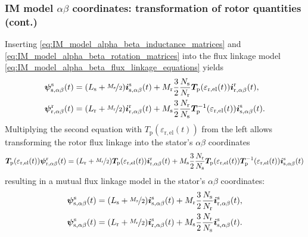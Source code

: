 \begin{frame}
	\frametitle{IM model $\alpha\beta$ coordinates: transformation of rotor quantities (cont.)}
    Inserting \eqref{eq:IM_model_alpha_beta_inductance_matrices} and \eqref{eq:IM_model_alpha_beta_rotation_matrices} into the flux linkage model \eqref{eq:IM_model_alpha_beta_flux_linkage_equations} yields
    \begin{equation}
        \begin{split}
            \bm{\psi}^\mathrm{s}_\mathrm{s,\alpha\beta}(t) & = (L_\mathrm{s} +\nicefrac{M_\mathrm{s}}{2}) \bm{i}^\mathrm{s}_{\mathrm{s},\alpha\beta}(t) +  M_{\mathrm{r}}\frac{3}{2}\frac{N_\mathrm{s}}{N_\mathrm{r}} \bm{T}_\mathrm{p}(\varepsilon_\mathrm{r,el}(t))\bm{i}^\mathrm{r}_{\mathrm{r},\alpha\beta}(t),\\
            \bm{\psi}^\mathrm{r}_\mathrm{r,\alpha\beta}(t) & = (L_\mathrm{r} +\nicefrac{M_\mathrm{r}}{2}) \bm{i}^\mathrm{r}_{\mathrm{r},\alpha\beta}(t) +  M_{\mathrm{s}}\frac{3}{2}\frac{N_\mathrm{r}}{N_\mathrm{s}} \bm{T}_\mathrm{p}^{-1}(\varepsilon_\mathrm{r,el}(t))\bm{i}^\mathrm{s}_{\mathrm{s},\alpha\beta}(t).
        \end{split}
    \end{equation}
    Multiplying the second equation with $T_\mathrm{p}(\varepsilon_\mathrm{r,el}(t))$ from the left allows transforming the rotor flux linkage into the stator's $\alpha\beta$ coordinates
    \begin{equation*}
            \bm{T}_\mathrm{p}(\varepsilon_\mathrm{r,el}(t))\bm{\psi}^\mathrm{r}_\mathrm{r,\alpha\beta}(t)  = (L_\mathrm{r} +\nicefrac{M_\mathrm{r}}{2}) \bm{T}_\mathrm{p}(\varepsilon_\mathrm{r,el}(t))\bm{i}^\mathrm{r}_{\mathrm{r},\alpha\beta}(t) +  M_{\mathrm{s}}\frac{3}{2}\frac{N_\mathrm{r}}{N_\mathrm{s}} \bm{T}_\mathrm{p}(\varepsilon_\mathrm{r,el}(t))\bm{T}_\mathrm{p}^{-1}(\varepsilon_\mathrm{r,el}(t))\bm{i}^\mathrm{s}_{\mathrm{s},\alpha\beta}(t)
    \end{equation*}
    resulting in a mutual flux linkage model in the stator's $\alpha\beta$ coordinates:
    \begin{equation}
        \begin{split}
            \bm{\psi}^\mathrm{s}_\mathrm{s,\alpha\beta}(t) & = (L_\mathrm{s} +\nicefrac{M_\mathrm{s}}{2}) \bm{i}^\mathrm{s}_{\mathrm{s},\alpha\beta}(t) +  M_{\mathrm{r}}\frac{3}{2}\frac{N_\mathrm{s}}{N_\mathrm{r}} \bm{i}^\mathrm{s}_{\mathrm{r},\alpha\beta}(t),\\
            \bm{\psi}^\mathrm{s}_\mathrm{s,\alpha\beta}(t) & = (L_\mathrm{r} +\nicefrac{M_\mathrm{r}}{2}) \bm{i}^\mathrm{s}_{\mathrm{r},\alpha\beta}(t) +  M_{\mathrm{s}}\frac{3}{2}\frac{N_\mathrm{r}}{N_\mathrm{s}} \bm{i}^\mathrm{s}_{\mathrm{s},\alpha\beta}(t).
        \end{split}
    \end{equation}
\end{frame}

